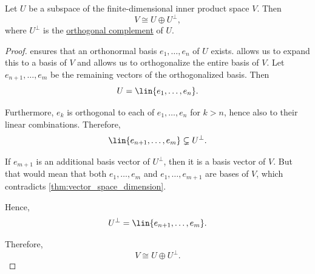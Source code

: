 \begin{proposition}\label{thm:direct_sum_with_orthogonal_complement}
  Let \( U \) be a subspace of the finite-dimensional inner product space \( V \). Then
  \begin{equation*}
    V \cong U \oplus U^\perp,
  \end{equation*}
  where \( U^\perp \) is the \hyperref[def:orthogonal_complement]{orthogonal complement} of \( U \).
\end{proposition}
\begin{proof}
   ensures that an orthonormal basis \( e_1, \ldots, e_n \) of \( U \) exists.  allows us to expand this to a basis of \( V \) and  allows us to orthogonalize the entire basis of \( V \). Let \( e_{n+1}, \ldots, e_m \) be the remaining vectors of the orthogonalized basis. Then
  \begin{equation*}
    U = \lin{ e_1, \ldots, e_n }.
  \end{equation*}

  Furthermore, \( e_k \) is orthogonal to each of \( e_1, \ldots, e_n \) for \( k > n \), hence also to their linear combinations. Therefore,
  \begin{equation*}
    \lin{ e_{n+1}, \ldots, e_m } \subsetneq U^\perp.
  \end{equation*}

  If \( e_{m+1} \) is an additional basis vector of \( U^\perp \), then it is a basis vector of \( V \). But that would mean that both \( e_1, \ldots, e_m \) and \( e_1, \ldots, e_{m+1} \) are bases of \( V \), which contradicts \cref{thm:vector_space_dimension}.

  Hence,
  \begin{equation*}
    U^\perp = \lin{ e_{n+1}, \ldots, e_m }.
  \end{equation*}

  Therefore,
  \begin{equation*}
    V \cong U \oplus U^\perp.
  \end{equation*}
\end{proof}

